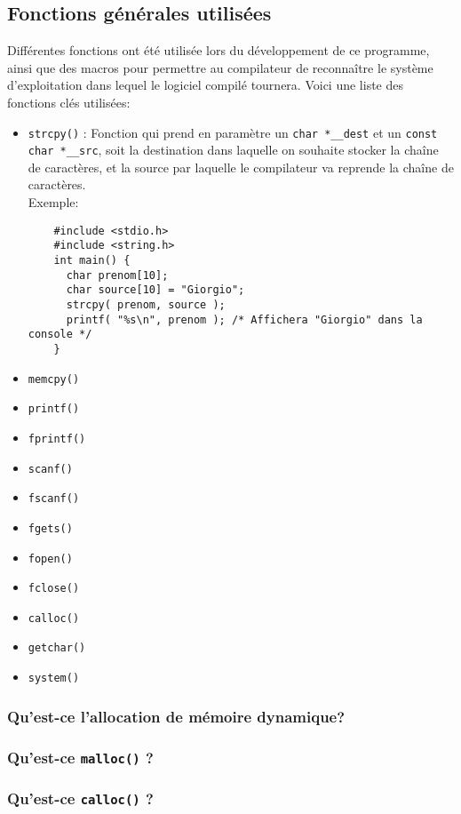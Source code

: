 \documentclass[11pt]{article}
\begin{document}
\subsection{Fonctions générales utilisées}
Différentes fonctions ont été utilisée lors du développement de ce programme, ainsi que des macros pour
permettre au compilateur de reconnaître le système d'exploitation dans lequel le logiciel compilé tournera.
Voici une liste des fonctions clés utilisées:
\begin{itemize}
\item \texttt{strcpy()} : Fonction qui prend en paramètre un \texttt{char *\_\_dest} et un
  \texttt{const char *\_\_src}, soit la destination dans laquelle on souhaite stocker la chaîne de caractères, et la
  source par laquelle le compilateur va reprende la chaîne de caractères.\\
  Exemple:
  \begin{lstlisting}
    #include <stdio.h>
    #include <string.h>
    int main() {
      char prenom[10];
      char source[10] = "Giorgio";
      strcpy( prenom, source );
      printf( "%s\n", prenom ); /* Affichera "Giorgio" dans la console */
    }
  \end{lstlisting}

\item \texttt{memcpy()}
\item \texttt{printf()}
\item \texttt{fprintf()}
\item \texttt{scanf()}
\item \texttt{fscanf()}
\item \texttt{fgets()}
\item \texttt{fopen()}
\item \texttt{fclose()}
\item \texttt{calloc()}
\item \texttt{getchar()}
\item \texttt{system()}
\end{itemize}

\subsubsection{Qu'est-ce l'allocation de mémoire dynamique?}
\subsubsection{Qu'est-ce \texttt{malloc()} ?}
\subsubsection{Qu'est-ce \texttt{calloc()} ?}
\end{document}
